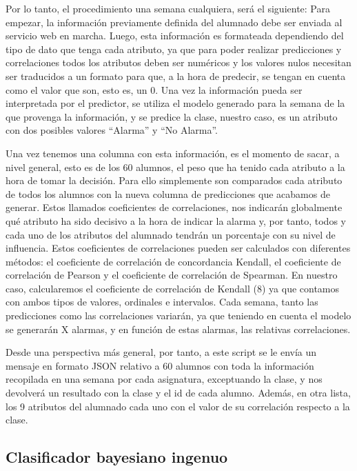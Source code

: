 Por lo tanto, el procedimiento una semana cualquiera, será el siguiente:
Para empezar, la información previamente definida del alumnado debe ser enviada al servicio web en marcha. Luego, esta información es formateada dependiendo del tipo de dato que tenga cada atributo, ya que para poder realizar predicciones y correlaciones todos los atributos deben ser numéricos y los valores nulos necesitan ser traducidos a un formato para que, a la hora de predecir, se tengan en cuenta como el valor que son, esto es, un 0. Una vez la información pueda ser interpretada por el predictor, se utiliza el modelo generado para la semana de la que provenga la información, y se predice la clase, nuestro caso, es un atributo con dos posibles valores “Alarma” y “No Alarma”.

Una vez tenemos una columna con esta información, es el momento de sacar, a nivel general, esto es de los 60 alumnos, el peso que ha tenido cada atributo a la hora de tomar la decisión. Para ello simplemente son comparados cada atributo de todos los alumnos con la nueva columna de predicciones que acabamos de generar. Estos llamados coeficientes de correlaciones, nos indicarán globalmente qué atributo ha sido decisivo a la hora de indicar la alarma y, por tanto, todos y cada uno de los atributos del alumnado tendrán un porcentaje con su nivel de influencia. Estos coeficientes de correlaciones pueden ser calculados con diferentes métodos: el coeficiente de correlación de concordancia Kendall, el coeficiente de correlación de Pearson y el coeficiente de correlación de Spearman. En nuestro caso, calcularemos el coeficiente de correlación de Kendall (8) ya que contamos con ambos tipos de valores, ordinales e intervalos.
Cada semana, tanto las predicciones como las correlaciones variarán, ya que teniendo en cuenta el modelo se generarán X alarmas, y en función de estas alarmas, las relativas correlaciones.
	
Desde una perspectiva más general, por tanto, a este script  se le envía un mensaje en formato JSON relativo a 60 alumnos con toda la información recopilada en una semana por cada asignatura, exceptuando la clase, y nos devolverá un resultado con la clase y el id de cada alumno. Además, en otra lista, los 9 atributos del alumnado cada uno con el valor de su correlación respecto a la clase.

\subsection{Clasificador bayesiano ingenuo}
